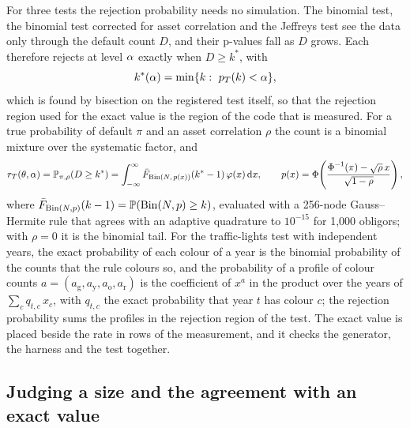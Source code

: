 For three tests the rejection probability needs no simulation.
The binomial test, the binomial test corrected for asset correlation and the Jeffreys test see the data only through the default count $D$, and their p-values fall as $D$ grows.
Each therefore rejects at level $\alpha$ exactly when $D\ge k^*$, with
\begin{equation}
k^*(\alpha)=\min\{k:\ p_T(k)<\alpha\},
\label{eq:kstar}
\end{equation}
which is found by bisection on the registered test itself, so that the rejection region used for the exact value is the region of the code that is measured.
For a true probability of default $\pi$ and an asset correlation $\rho$ the count is a binomial mixture over the systematic factor, and
\begin{equation}
r_T(\theta,\alpha)=\mathbb{P}_{\pi,\rho}(D\ge k^*)=\int_{-\infty}^{\infty}\bar F_{\operatorname{Bin}(N,\,p(x))}(k^*-1)\,\varphi(x)\,\mathrm{d} x,\qquad
p(x)=\operatorname{\Phi}\!\left(\frac{\operatorname{\Phi}^{-1}(\pi)-\sqrt\rho\,x}{\sqrt{1-\rho}}\right),
\label{eq:mixture}
\end{equation}
where $\bar F_{\operatorname{Bin}(N,p)}(k-1)=\mathbb{P}(\operatorname{Bin}(N,p)\ge k)$, evaluated with a 256-node Gauss--Hermite rule that agrees with an adaptive quadrature to $10^{-15}$ for 1,000 obligors; with $\rho=0$ it is the binomial tail.
For the traffic-lights test with independent years, the exact probability of each colour of a year is the binomial probability of the counts that the rule colours so, and the probability of a profile of colour counts $a=(a_\mathrm{g},a_\mathrm{y},a_\mathrm{o},a_\mathrm{r})$ is the coefficient of $x^a$ in the product over the years of $\sum_{c}q_{t,c}\,x_c$, with $q_{t,c}$ the exact probability that year $t$ has colour $c$; the rejection probability sums the profiles in the rejection region of the test.
The exact value is placed beside the rate in \nExactRows{} rows of the measurement, and it checks the generator, the harness and the test together.

\subsection{Judging a size and the agreement with an exact value}
\label{sec:pm-judgement}


